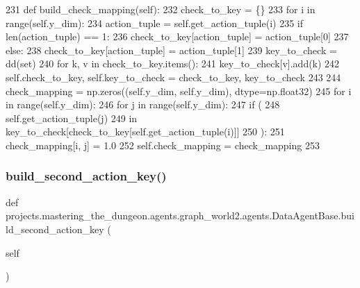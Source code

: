 \begin{DoxyCode}
231     \textcolor{keyword}{def }build\_check\_mapping(self):
232         check\_to\_key = \{\}
233         \textcolor{keywordflow}{for} i \textcolor{keywordflow}{in} range(self.y\_dim):
234             action\_tuple = self.get\_action\_tuple(i)
235             \textcolor{keywordflow}{if} len(action\_tuple) == 1:
236                 check\_to\_key[action\_tuple] = action\_tuple[0]
237             \textcolor{keywordflow}{else}:
238                 check\_to\_key[action\_tuple] = action\_tuple[1]
239         key\_to\_check = dd(set)
240         \textcolor{keywordflow}{for} k, v \textcolor{keywordflow}{in} check\_to\_key.items():
241             key\_to\_check[v].add(k)
242         self.check\_to\_key, self.key\_to\_check = check\_to\_key, key\_to\_check
243 
244         check\_mapping = np.zeros((self.y\_dim, self.y\_dim), dtype=np.float32)
245         \textcolor{keywordflow}{for} i \textcolor{keywordflow}{in} range(self.y\_dim):
246             \textcolor{keywordflow}{for} j \textcolor{keywordflow}{in} range(self.y\_dim):
247                 \textcolor{keywordflow}{if} (
248                     self.get\_action\_tuple(j)
249                     \textcolor{keywordflow}{in} key\_to\_check[check\_to\_key[self.get\_action\_tuple(i)]]
250                 ):
251                     check\_mapping[i, j] = 1.0
252         self.check\_mapping = check\_mapping
253 
\end{DoxyCode}
\mbox{\label{classprojects_1_1mastering__the__dungeon_1_1agents_1_1graph__world2_1_1agents_1_1DataAgentBase_ae9bff71865291c397ed4acce957c3234}} 
\subsubsection{\texorpdfstring{build\+\_\+second\+\_\+action\+\_\+key()}{build\_second\_action\_key()}}
{\footnotesize\ttfamily def projects.\+mastering\+\_\+the\+\_\+dungeon.\+agents.\+graph\+\_\+world2.\+agents.\+Data\+Agent\+Base.\+build\+\_\+second\+\_\+action\+\_\+key (\begin{DoxyParamCaption}\item[{}]{self }\end{DoxyParamCaption})}



